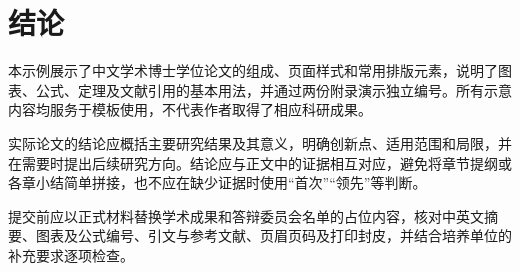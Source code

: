 
\chapter{结论}

本示例展示了中文学术博士学位论文的组成、页面样式和常用排版元素，说明了图表、公式、定理及文献引用的基本用法，并通过两份附录演示独立编号。所有示意内容均服务于模板使用，不代表作者取得了相应科研成果。

实际论文的结论应概括主要研究结果及其意义，明确创新点、适用范围和局限，并在需要时提出后续研究方向。结论应与正文中的证据相互对应，避免将章节提纲或各章小结简单拼接，也不应在缺少证据时使用“首次”“领先”等判断。

提交前应以正式材料替换学术成果和答辩委员会名单的占位内容，核对中英文摘要、图表及公式编号、引文与参考文献、页眉页码及打印封皮，并结合培养单位的补充要求逐项检查。
